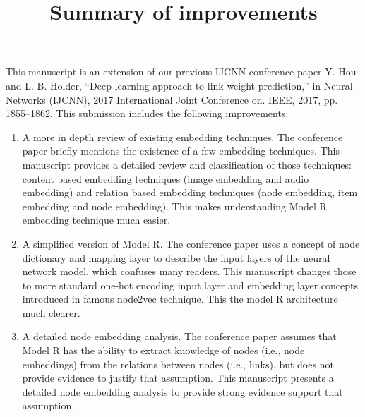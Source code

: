\documentclass{article}
\begin{document}
\title{Summary of improvements}
\maketitle

This manuscript is an extension of our previous IJCNN conference paper
Y. Hou and L. B. Holder, “Deep learning approach to link weight
prediction,” in Neural Networks (IJCNN), 2017 International Joint
Conference on. IEEE, 2017, pp. 1855–1862.
This submission includes the following improvements:
\begin{enumerate}
	\item A more in depth review of existing embedding techniques.
	The conference paper briefly mentions the existence of a few embedding techniques.
	This manuscript provides a detailed review and classification of those techniques: content based embedding techniques (image embedding and audio embedding) and relation based embedding techniques (node embedding, item embedding and node embedding).
	This makes understanding Model R embedding technique much easier.
	\item A simplified version of Model R.
	The conference paper uses a concept of node dictionary and mapping layer to describe the input layers of the neural network model, which confuses many readers.
	This manuscript changes those to more standard one-hot encoding input layer and embedding layer concepts introduced in famous node2vec technique.
	This the model R architecture much clearer.
	\item A detailed node embedding analysis.
	The conference paper assumes that Model R has the ability to extract knowledge of nodes (i.e., node embeddings) from the relations between nodes (i.e., links), but does not provide evidence to justify that assumption.
	This manuscript presents a detailed node embedding analysis to provide strong evidence support that assumption.
\end{enumerate}
\end{document}
